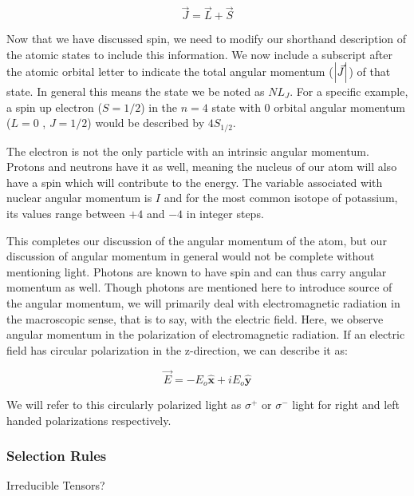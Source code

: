 \documentclass[letter,12pt]{article}
\newcommand{\xhat}{\hat{\textbf{x}}}
\newcommand{\yhat}{\hat{\textbf{y}}}
\begin{document}
        \begin{equation}
            \vec{J} = \vec{L} + \vec{S}
        \end{equation}

        Now that we have discussed spin, we need to modify our 
        shorthand description of the atomic states to include
        this information. We now include a subscript after
        the atomic orbital letter to indicate the total angular
        momentum ($\abs{\vec{J}}$) of that state. In general
		this means the state we be noted as $NL_{J}$. For 
		a specific example, 
        a spin up electron ($S=1/2$) in the $n=4$ state with 
        0 orbital angular momentum ($L=0$ , $J=1/2$) would be 
        described by $4S_{1/2}$.

        The electron is not the only particle with an intrinsic
        angular momentum. Protons and neutrons have it as well,
        meaning the nucleus of our atom will also have a
        spin which will contribute to the energy. The variable
        associated with nuclear angular momentum is $I$ and
        for the most common isotope of potassium, its values
        range between $+4$ and $-4$ in integer steps. 
	
		This completes our discussion of the angular momentum
		of the atom, but our discussion of angular momentum in 
		general would not be complete without mentioning light.
		Photons are known to have spin and can thus carry 
		angular momentum as well. Though photons are mentioned
		here to introduce source of the angular momentum,
		we will primarily deal with
		electromagnetic radiation in the macroscopic sense, 
		that is to say, with the electric field. Here, we 
		observe angular momentum in the polarization of 
		electromagnetic radiation. If an electric field has
		circular polarization in the z-direction, we can 
		describe it as:

		\begin{equation}
			\vec{E}=-E_o \xhat  +iE_o \yhat 
		\end{equation}

		We will refer to this circularly polarized light as 
		$\sigma^{+}$ or $\sigma^{-}$ light for right and 
		left handed polarizations respectively.
		\subsubsection{Selection Rules}\label{selectionRules}

        Irreducible Tensors?
\end{document}
